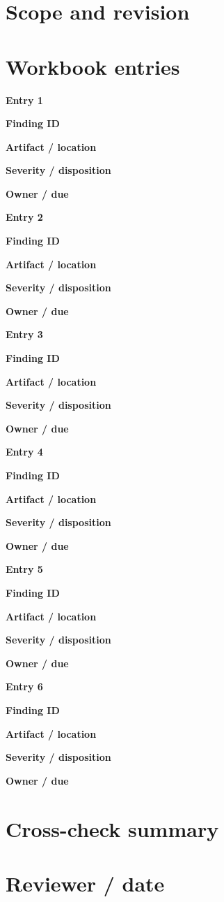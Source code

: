 \documentclass[10pt,letterpaper]{article}
\begin{document}
\DocProvenance
\section{Scope and revision}
\section{Workbook entries}
\textbf{Entry 1}\par
\textbf{Finding ID}\par{}
\textbf{Artifact / location}\par{}
\textbf{Severity / disposition}\par{}
\textbf{Owner / due}\par{}
\textbf{Entry 2}\par
\textbf{Finding ID}\par{}
\textbf{Artifact / location}\par{}
\textbf{Severity / disposition}\par{}
\textbf{Owner / due}\par{}
\textbf{Entry 3}\par
\textbf{Finding ID}\par{}
\textbf{Artifact / location}\par{}
\textbf{Severity / disposition}\par{}
\textbf{Owner / due}\par{}
\textbf{Entry 4}\par
\textbf{Finding ID}\par{}
\textbf{Artifact / location}\par{}
\textbf{Severity / disposition}\par{}
\textbf{Owner / due}\par{}
\textbf{Entry 5}\par
\textbf{Finding ID}\par{}
\textbf{Artifact / location}\par{}
\textbf{Severity / disposition}\par{}
\textbf{Owner / due}\par{}
\textbf{Entry 6}\par
\textbf{Finding ID}\par{}
\textbf{Artifact / location}\par{}
\textbf{Severity / disposition}\par{}
\textbf{Owner / due}\par{}
\section{Cross-check summary}
\section{Reviewer / date}
\end{document}
